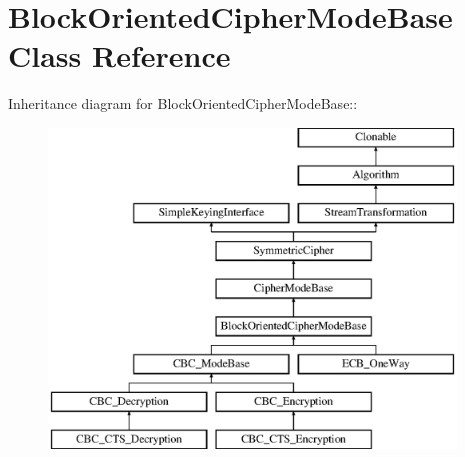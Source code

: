 \hypertarget{class_block_oriented_cipher_mode_base}{
\section{BlockOrientedCipherModeBase Class Reference}
\label{class_block_oriented_cipher_mode_base}
}
Inheritance diagram for BlockOrientedCipherModeBase::\begin{figure}[H]
\begin{center}
\leavevmode
\includegraphics[height=8.48485cm]{class_block_oriented_cipher_mode_base}
\end{center}
\end{figure}
